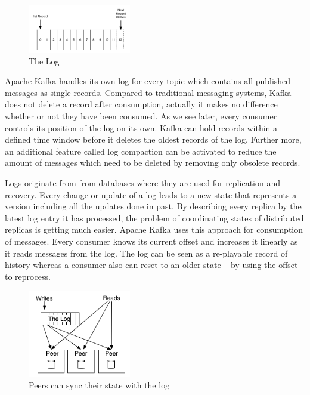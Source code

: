 \begin{figure}[H]
    \centering
    \includegraphics[width=0.4\textwidth]{images/log.png}
    \caption{The  Log \cite{JK-TheLog}}
    \label{fig:the-log}
\end{figure}

Apache Kafka handles its own log for every topic which contains all
published messages as single records. Compared to traditional messaging systems,
Kafka does not delete a record after consumption, actually it makes no difference
 whether or not they have been consumed. As we see later, every consumer
controls its position of the log on its own. Kafka can hold records within a
defined time window before it deletes the oldest records of the log.
Further more, an additional feature called log compaction can be activated to
reduce the amount of messages which need to be deleted by removing only obsolete
records. \cite{apachekafka} \cite{JK-TheLog}

Logs originate from from databases where they are used for replication and
recovery. Every change or update of a log leads to a new state that represents a
version including all the updates done in past. By describing every replica by the
latest log entry it has processed, the problem of coordinating states of
distributed replicas is getting much easier. Apache Kafka uses this approach for
consumption of messages. Every consumer knows its current offset and increases it
linearly as it reads messages from the log. The log can be seen as a re-playable
record of history whereas a consumer also can reset to an older state -- by using
the offset -- to reprocess. \cite{JK-TheLog}

\begin{figure}[H]
    \centering
    \includegraphics[width=0.4\textwidth]{images/state-machine-replication.png}
    \caption{Peers can sync their state with the log \cite{JK-TheLog}}
    \label{fig:the-log}
\end{figure}

